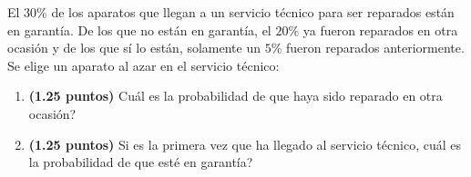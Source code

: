 
El $30\%$ de los aparatos que llegan a un servicio técnico para ser reparados están en garantía. De los que no están en garantía, el $20\%$ ya fueron reparados en otra ocasión y de los que sí lo están, solamente un $5\%$ fueron reparados anteriormente. Se elige un aparato al azar en el servicio técnico:
\begin{enumerate}[label=\alph*)]
\item \textbf{(1.25 puntos)} \textquestiondown{}Cuál es la probabilidad de que haya sido reparado en otra ocasión?
\item \textbf{(1.25 puntos)} Si es la primera vez que ha llegado al servicio técnico, \textquestiondown{}cuál es la probabilidad de que esté en garantía?
\end{enumerate}
